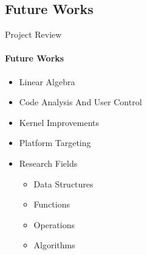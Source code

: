	\subsection{Future Works}
	\begin{frame}[t]{Project Review}\framesubtitle{Future Works}
		\begin{itemize}
			\item Linear Algebra
			\item Code Analysis And User Control
			\item Kernel Improvements
			\item Platform Targeting
			\item Research Fields
			\begin{itemize}
				\item Data Structures
				\item Functions
				\item Operations
				\item Algorithms
			\end{itemize}
		\end{itemize}
	\end{frame}